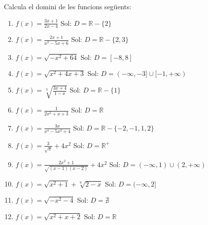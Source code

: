\documentclass{article}
\begin{document}
	\author{Mireia Dosil}
	\date{text}

Calcula el domini de les funcions següents:

\begin{enumerate}
 

\item $f(x)=\frac{3x+1}{2x-4}$ Sol: $D=\mathbb{R}-\{2\}$
\item $f(x)=\frac{2x+1}{x^2-5x+6}$ Sol: $D=\mathbb{R}-\{2,3\}$
\item $f(x)=\sqrt{-x^2+64}$ Sol: $D=[-8,8]$
\item $f(x)=\sqrt{x^2+4x+3}$ Sol: $D=(-\infty,-3] \cup [-1, +\infty)$
\item $f(x)=\sqrt[3]{\frac{3x+4}{1-x}}$ Sol: $D=\mathbb{R}-\{1\}$
\item $f(x)=\frac{1}{2x^2+x+3}$ Sol: $D=\mathbb{R}$
\item $f(x)=\frac{3x}{x^4-5x^2+4}$ Sol: $D=\mathbb{R}-\{-2,-1,1,2\}$
\item $f(x)=\frac{3}{\sqrt{x}}+4x^2$ Sol: $D=\mathbb{R}^+$
\item $f(x)=\frac{2x^2+1}{\sqrt{(x-1)(x-2)}}+4x^2$ Sol: $D=(-\infty,1) \cup (2, +\infty)$
\item $f(x)=\sqrt{x^2+1}+\sqrt[6]{2-x}$ Sol: $D=(-\infty,2]$
\item $f(x)=\sqrt{-x^2-4}$ Sol: $D=\nexists$
\item $f(x)=\sqrt{x^2+x+2}$ Sol: $D=\mathbb{R}$
\end{enumerate}
 
\end{document}
